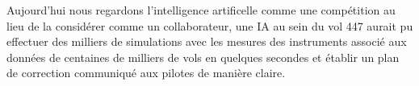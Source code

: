         Aujourd'hui nous regardons l'intelligence artificelle comme une compétition au lieu 
        de la considérer comme un collaborateur, une IA au sein du vol 447 aurait pu effectuer 
        des milliers de simulations avec les mesures des instruments associé aux données 
        de centaines de milliers de vols en quelques secondes et établir un plan de correction
        communiqué aux pilotes de manière claire.